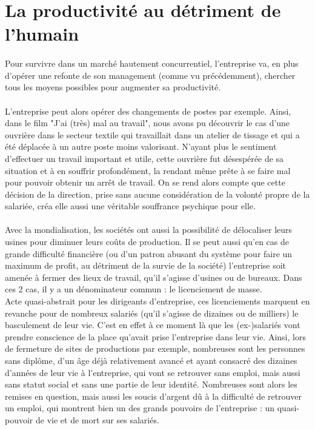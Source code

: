 \documentclass{report}
\begin{document}
	\section{La productivité au détriment de l'humain}
		\paragraph{}
			Pour survivre dans un marché hautement concurrentiel, l'entreprise va, en plus d'opérer une refonte de son management (comme vu précédemment), chercher tous les moyens possibles pour augmenter sa productivité. 
		\paragraph{}
			L'entreprise peut alors opérer des changements de postes par exemple. Ainsi, dans le film "J'ai (très) mal au travail", nous avons pu découvrir le cas d'une ouvrière dans le secteur textile qui travaillait dans un atelier de tissage et qui a été déplacée à un autre poste moins valorisant. N'ayant plus le sentiment d'effectuer un travail important et utile, cette ouvrière fut désespérée de sa situation et à en souffrir profondément, la rendant même prête à se faire mal pour pouvoir obtenir un arrêt de travail. On se rend alors compte que cette décision de la direction, prise sans aucune considération de la volonté propre de la salariée, créa elle aussi une véritable souffrance psychique pour elle.
		\paragraph{}
			Avec la mondialisation, les sociétés ont aussi la possibilité de délocaliser leurs usines pour diminuer leurs coûts de production. Il se peut aussi qu'en cas de grande difficulté financière (ou d'un patron abusant du système pour faire un maximum de profit, au détriment de la survie de la société) l'entreprise soit amenée à fermer des lieux de travail, qu'il s'agisse d'usines ou de bureaux. Dans ces 2 cas, il y a un dénominateur commun : le licenciement de masse.\\
			Acte quasi-abstrait pour les dirigeants d'entreprise, ces licenciements marquent en revanche pour de nombreux salariés (qu'il s'agisse de dizaines ou de milliers) le basculement de leur vie. C'est en effet à ce moment là que les (ex-)salariés vont prendre conscience de la place qu'avait prise l'entreprise dans leur vie. Ainsi, lors de fermeture de sites de productions par exemple, nombreuses sont les personnes sans diplôme, d'un âge déjà relativement avancé et ayant consacré des dizaines d'années de leur vie à l'entreprise, qui vont se retrouver sans emploi, mais aussi sans statut social et sans une partie de leur identité. Nombreuses sont alors les remises en question, mais aussi les soucis d'argent dû à la difficulté de retrouver un emploi, qui montrent bien un des grands pouvoirs de l'entreprise : un quasi-pouvoir de vie et de mort sur ses salariés.
\end{document}
